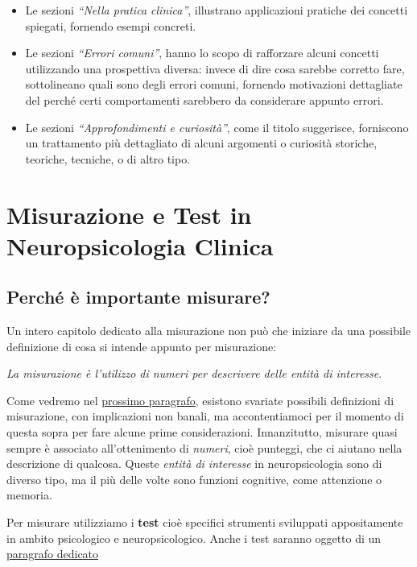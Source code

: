 \documentclass[
  italian,
  letterpaper,
  paper=6in:9in,
  pagesize=pdftex,
  headinclude=on,
  footinclude=on,
  11pt]{scrbook}
\providecommand{\tightlist}{%
  \setlength{\itemsep}{0pt}\setlength{\parskip}{0pt}}
\begin{document}
\begin{itemize}
\tightlist
\item
  Le sezioni \emph{``Nella pratica clinica''}, illustrano applicazioni
  pratiche dei concetti spiegati, fornendo esempi concreti.
\item
  Le sezioni \emph{``Errori comuni''}, hanno lo scopo di rafforzare
  alcuni concetti utilizzando una prospettiva diversa: invece di dire
  cosa sarebbe corretto fare, sottolineano quali sono degli errori
  comuni, fornendo motivazioni dettagliate del perché certi
  comportamenti sarebbero da considerare appunto errori.
\item
  Le sezioni \emph{``Approfondimenti e curiosità''}, come il titolo
  suggerisce, forniscono un trattamento più dettagliato di alcuni
  argomenti o curiosità storiche, teoriche, tecniche, o di altro tipo.
\end{itemize}


\chapter{Misurazione e Test in Neuropsicologia
Clinica}\label{misurazione-e-test-in-neuropsicologia-clinica}

\section{Perché è importante
misurare?}\label{perchuxe9-uxe8-importante-misurare}

Un intero capitolo dedicato alla misurazione non può che iniziare da una
possibile definizione di cosa si intende appunto per misurazione:

\emph{La misurazione è l'utilizzo di numeri per descrivere delle entità
di interesse}.

Come vedremo nel
\hyperref[misurazione_e_neuropsicologia_clinica]{prossimo paragrafo},
esistono svariate possibili definizioni di misurazione, con implicazioni
non banali, ma accontentiamoci per il momento di questa sopra per fare
alcune prime considerazioni. Innanzitutto, misurare quasi sempre è
associato all'ottenimento di \emph{numeri}, cioè punteggi, che ci
aiutano nella descrizione di qualcosa. Queste \emph{entità di interesse}
in neuropsicologia sono di diverso tipo, ma il più delle volte sono
funzioni cognitive, come attenzione o memoria.

Per misurare utilizziamo i \textbf{test} cioè specifici strumenti
sviluppati appositamente in ambito psicologico e neuropsicologico. Anche
i test saranno oggetto di un \hyperref[i-test]{paragrafo dedicato}
\end{document}
